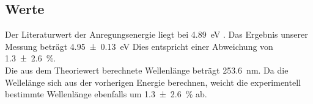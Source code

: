 \subsection{Werte}

Der Literaturwert der Anregungsenergie liegt bei \qty{4.89}{\electronvolt} \cite{HG_Energie}. Das Ergebnis unserer Messung beträgt 
\qty{4.95\pm0.13}{\electronvolt} Dies entspricht einer Abweichung von \qty{1.3\pm2.6}{\percent}.\\
Die aus dem Theoriewert berechnete Wellenlänge beträgt \qty{253.6}{\nano\meter}. Da die Wellelänge sich aus der vorherigen Energie berechnen, 
weicht die experimentell bestimmte Wellenlänge ebenfalls um \qty{1.3\pm2.6}{\percent} ab.    



